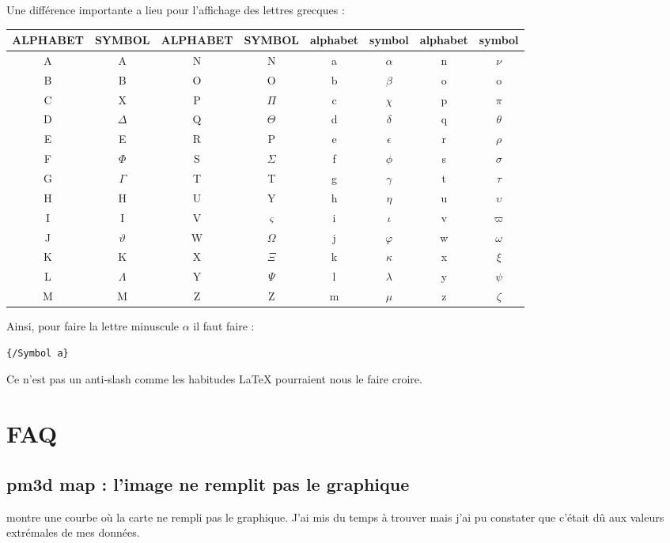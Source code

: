 \documentclass[a4paper,twoside]{article}
\begin{document}
Une différence importante a lieu pour l'affichage des lettres grecques : 
\begin{center}
\begin{tabular}{*{4}{|c|c|}}
\hline
ALPHABET  & SYMBOL  & ALPHABET  & SYMBOL  & alphabet  & symbol  & alphabet  & symbol \\\hline\hline
A  & A  & N  & N  & a  & $\alpha$  & n  & $\nu$\\\hline
B  & B  & O  & O  & b  & $\beta$  & o  & o\\\hline
C  & X  & P  & $\Pi$  & c  & $\chi$  & p  & $\pi$\\\hline
D  & $\Delta$  & Q  & $\Theta$  & d  & $\delta$  & q  & $\theta$\\\hline
E  & E  & R  & P  & e  & $\epsilon$  & r  & $\rho$\\\hline
F  & $\Phi$  & S  & $\Sigma$  & f  & $\phi$  & s  & $\sigma$\\\hline
G  & $\Gamma$  & T  & T  & g  & $\gamma$  & t  & $\tau$\\\hline
H  & H  & U  & Y  & h  & $\eta$  & u  & $\upsilon$\\\hline
I  & I  & V  & $\varsigma$  & i  & $\iota$  & v & $\varpi$\\\hline
J & $\vartheta$ & W  & $\Omega$ & j & $\varphi$ & w  & $\omega$\\\hline
K  & K  & X  & $\Xi$  & k  & $\kappa$  & x  & $\xi$\\\hline
L  & $\Lambda$  & Y  & $\Psi$  & l  & $\lambda$  & y  & $\psi$\\\hline
M  & M  & Z  & Z  & m  & $\mu$  & z  & $\zeta $\\\hline
\end{tabular}
\end{center}

Ainsi, pour faire la lettre minuscule $\alpha$ il faut faire : 
\begin{verbatim}
{/Symbol a}
\end{verbatim}

\begin{attention}
Ce n'est pas un anti-slash comme les habitudes \LaTeX{} pourraient nous le faire croire.
\end{attention}

\section{FAQ}
\subsection{pm3d map : l'image ne remplit pas le graphique}
 montre une courbe où la carte ne rempli pas le graphique. J'ai mis du temps à trouver mais j'ai pu constater que c'était dû aux valeurs extrémales de mes données. 
\end{document}
